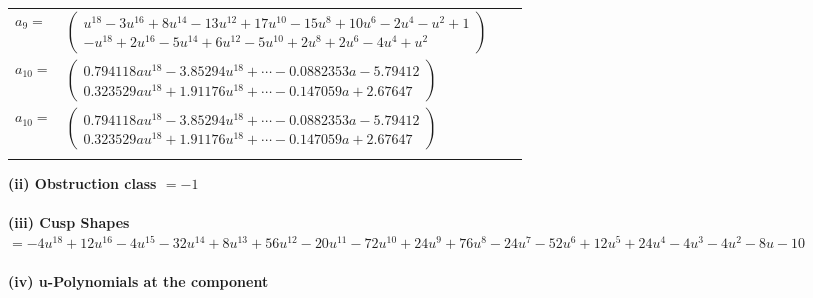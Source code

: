 \documentclass[1p]{elsarticle_modified}
\theoremstyle{definition}
\begin{document}
\begin{tabular}{m{7pt} m{180pt} m{7pt} m{180pt} }
\flushright $a_{9}=$&$\begin{pmatrix}u^{18}-3 u^{16}+8 u^{14}-13 u^{12}+17 u^{10}-15 u^8+10 u^6-2 u^4- u^2+1\\- u^{18}+2 u^{16}-5 u^{14}+6 u^{12}-5 u^{10}+2 u^8+2 u^6-4 u^4+u^2\end{pmatrix}$ \\
\flushright $a_{10}=$&$\begin{pmatrix}0.794118 a u^{18}-3.85294 u^{18}+\cdots-0.0882353 a-5.79412\\0.323529 a u^{18}+1.91176 u^{18}+\cdots-0.147059 a+2.67647\end{pmatrix}$\\ \flushright $a_{10}=$&$\begin{pmatrix}0.794118 a u^{18}-3.85294 u^{18}+\cdots-0.0882353 a-5.79412\\0.323529 a u^{18}+1.91176 u^{18}+\cdots-0.147059 a+2.67647\end{pmatrix}$\\&\end{tabular}
\flushleft \textbf{(ii) Obstruction class $= -1$}\\~\\
\flushleft \textbf{(iii) Cusp Shapes $= -4 u^{18}+12 u^{16}-4 u^{15}-32 u^{14}+8 u^{13}+56 u^{12}-20 u^{11}-72 u^{10}+24 u^9+76 u^8-24 u^7-52 u^6+12 u^5+24 u^4-4 u^3-4 u^2-8 u-10$}\\~\\
\newpage\renewcommand{\arraystretch}{1}
\flushleft \textbf{(iv) u-Polynomials at the component}\newline \\
\end{document}
